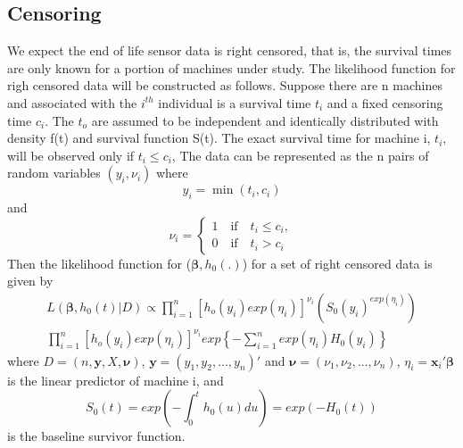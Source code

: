 \documentclass[english]{article}
\numberwithin{equation}{section}
\begin{document}
\subsection*{Censoring}
We expect the end of life sensor data is right censored, that is, the survival times are only known for a portion of machines under study.  The likelihood function for righ censored data will be constructed as follows.  Suppose there are n machines and associated with the $i^{th}$ individual is a survival time $t_i$ and a fixed censoring time $c_i$.  The $t_o$ are assumed to be independent and identically distributed with density f(t) and survival function S(t).  The exact survival time for machine i, $t_i$, will be observed only if $t_i \le c_i$,  The data can be represented as the n pairs of random variables $(y_i, \nu_i)$ where
\begin{equation}
y_i=\min(t_i, c_i)
\end{equation}
and
\begin{equation}
\nu_i=\begin{cases}
1 \quad \text{if} \quad t_i \le c_i,\\
0 \quad \text{if} \quad t_i > c_i
\end{cases}
\end{equation}
Then the likelihood function for ($\mathbf{\beta}, h_0(.)$) for a set of right censored data is given by
\begin{equation}
\begin{split}
L(\mathbf{\beta}, h_0(t) | D) \propto \prod_{i=1}^n [h_o(y_i) exp(\eta_i)]^{\nu_i} (S_0(y_i)^{exp(\eta_i)})\\
\prod_{i=1}^n [h_o(y_i) exp(\eta_i)]^{\nu_i} exp \left \{ 
-\sum_{i=1}^n exp(\eta_i)H_0(y_i) \right \}
\end{split}
\end{equation}
where $D=(n,\mathbf{y}, X, \mathbf{\nu})$, $\mathbf{y}=(y_1, y_2,...,y_n)'$ and $\mathbf{\nu}=(\nu_1, \nu_2, ...,\nu_n)$, $\eta_i=\mathbf{x}_i' \mathbf{\beta}$ is the linear predictor of machine i, and
\begin{equation}
S_0(t)=exp(-\int_0^t h_0(u)du)=exp(-H_0(t))
\end{equation}
is the baseline survivor function.
\end{document}
